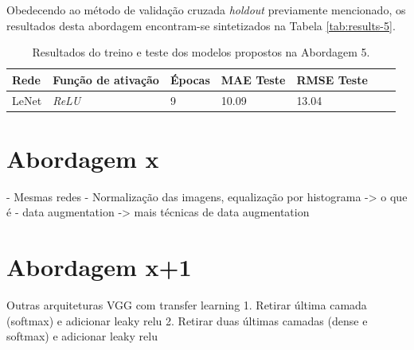 	Obedecendo ao método de validação cruzada \emph{holdout} previamente mencionado, os resultados desta abordagem encontram-se sintetizados na Tabela \ref{tab:results-5}.

	\begin{table}[!ht]
		\centering
		\caption{Resultados do treino e teste dos modelos propostos na Abordagem 5.}
		\label{tab:results-2}
			\begin{tabular}{l l l l l l l}
				\toprule
				Rede & Função de ativação & Épocas & MAE Teste & RMSE Teste \\
				\midrule
				LeNet & \emph{ReLU} & 9 &  10.09 & 13.04 \\
				\bottomrule
			\end{tabular}
		\end{table}


\section{Abordagem x}

- Mesmas redes
- Normalização das imagens, equalização por histograma -> o que é
- data augmentation ->  mais técnicas de data augmentation

\section{Abordagem x+1}

Outras arquiteturas
VGG
com transfer learning
1. Retirar última camada (softmax) e adicionar leaky relu
2. Retirar duas últimas camadas (dense e softmax) e adicionar leaky relu
